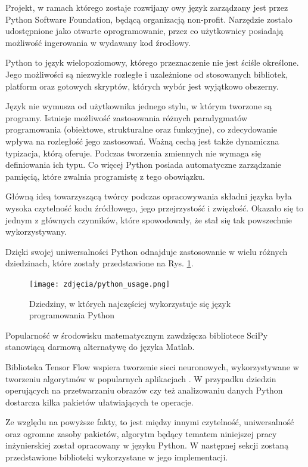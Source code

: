 Projekt, w ramach którego zostaje rozwijany owy język zarządzany jest przez Python Software Foundation, będącą organizacją non-profit. Narzędzie zostało udostępnione jako otwarte oprogramowanie, przez co użytkownicy posiadają możliwość ingerowania w wydawany kod źrodłowy.

Python to język wielopoziomowy, którego przeznaczenie nie jest ściśle określone. Jego możliwości są niezwykle rozległe i uzależnione od stosowanych bibliotek, platform oraz gotowych skryptów, których wybór jest wyjątkowo obszerny. 

Język nie wymusza od użytkownika jednego stylu, w którym tworzone są programy. Istnieje możliwość zastosowania różnych paradygmatów programowania (obiektowe, strukturalne oraz funkcyjne), co zdecydowanie wpływa na rozległość jego zastosowań. Ważną cechą jest także dynamiczna typizacja, którą oferuje. Podczas tworzenia zmiennych nie wymaga się definiowania ich typu. Co więcej Python posiada automatyczne zarządzanie pamięcią, które zwalnia programistę z tego obowiązku. 

Główną ideą towarzyszącą twórcy podczas opracowywania składni języka była wysoka czytelność kodu źródłowego, jego przejrzystość i zwięzłość. Okazało się to jednym z głównych czynników, które spowodowały, że stał się tak powszechnie wykorzystywany.

Dzięki swojej uniwersalności Python odnajduje zastosowanie w wielu różnych dziedzinach, które zostały przedstawione na Rys. \ref{fig:pythonUsage}. 

\begin{figure}[h]
	\centering
	\texttt{[image: zdjęcia/python\_usage.png]}
	\caption{Dziedziny, w których najczęściej wykorzystuje się język programowania Python} 
	\label{fig:pythonUsage}
\end{figure}

Popularność w środowisku matematycznym zawdzięcza bibliotece SciPy stanowiącą darmową alternatywę do języka Matlab. 

Biblioteka Tensor Flow wspiera tworzenie sieci neuronowych, wykorzystywane w tworzeniu algorytmów w popularnych aplikacjach \cite{PythonApps}. W przypadku dziedzin operujących na przetwarzaniu obrazów czy też analizowaniu danych Python dostarcza kilka pakietów ułatwiających te operacje.

Ze względu na powyższe fakty, to jest między innymi czytelność, uniwersalność oraz ogromne zasoby pakietów, algorytm będący tematem niniejszej pracy inżynierskiej został opracowany w języku Python. W następnej sekcji zostaną przedstawione biblioteki wykorzystane w jego implementacji.

